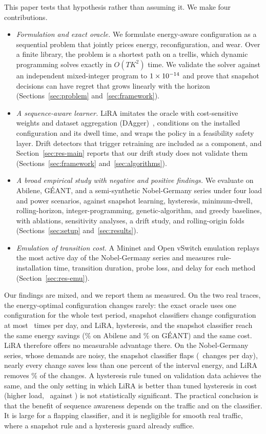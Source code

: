 \documentclass[journal]{IEEEtran}
\begin{document}
This paper tests that hypothesis rather than assuming it. We make four contributions.

\begin{itemize}
\item \emph{Formulation and exact oracle.} We formulate energy-aware configuration as a sequential problem that jointly prices energy, reconfiguration, and wear. Over a finite library, the problem is a shortest path on a trellis, which dynamic programming solves exactly in $O(TK^2)$ time. We validate the solver against an independent mixed-integer program to $1\times10^{-14}$ and prove that snapshot decisions can have regret that grows linearly with the horizon (Sections~\ref{sec:problem} and~\ref{sec:framework}).
\item \emph{A sequence-aware learner.} LiRA imitates the oracle with cost-sensitive weights and dataset aggregation (DAgger)~\cite{ross2011dagger}, conditions on the installed configuration and its dwell time, and wraps the policy in a feasibility safety layer. Drift detectors that trigger retraining are included as a component, and Section~\ref{sec:res-main} reports that our drift study does not validate them (Sections~\ref{sec:framework} and~\ref{sec:algorithms}).
\item \emph{A broad empirical study with negative and positive findings.} We evaluate on Abilene, G\'{E}ANT, and a semi-synthetic Nobel-Germany series under four load and power scenarios, against snapshot learning, hysteresis, minimum-dwell, rolling-horizon, integer-programming, genetic-algorithm, and greedy baselines, with ablations, sensitivity analyses, a drift study, and rolling-origin folds (Sections~\ref{sec:setup} and~\ref{sec:results}).
\item \emph{Emulation of transition cost.} A Mininet and Open vSwitch emulation replays the most active day of the Nobel-Germany series and measures rule-installation time, transition duration, probe loss, and delay for each method (Section~\ref{sec:res-emu}).
\end{itemize}

Our findings are mixed, and we report them as measured. On the two real traces, the energy-optimal configuration changes rarely: the exact oracle uses one configuration for the whole test period, snapshot classifiers change configuration at most \abiBFourchg\ times per day, and LiRA, hysteresis, and the snapshot classifier reach the same energy savings (\abiSav\% on Abilene and \geaSav\% on G\'{E}ANT) and the same cost. LiRA therefore offers no measurable advantage there. On the Nobel-Germany series, whose demands are noisy, the snapshot classifier flaps (\nobBFourchg\ changes per day), nearly every change saves less than one percent of the interval energy, and LiRA removes \nobY\% of the changes. A hysteresis rule tuned on validation data achieves the same, and the only setting in which LiRA is better than tuned hysteresis in cost (higher load, \nobhlJLiRA\ against \nobhlJBSix) is not statistically significant. The practical conclusion is that the benefit of sequence awareness depends on the traffic and on the classifier. It is large for a flapping classifier, and it is negligible for smooth real traffic, where a snapshot rule and a hysteresis guard already suffice.
\end{document}

